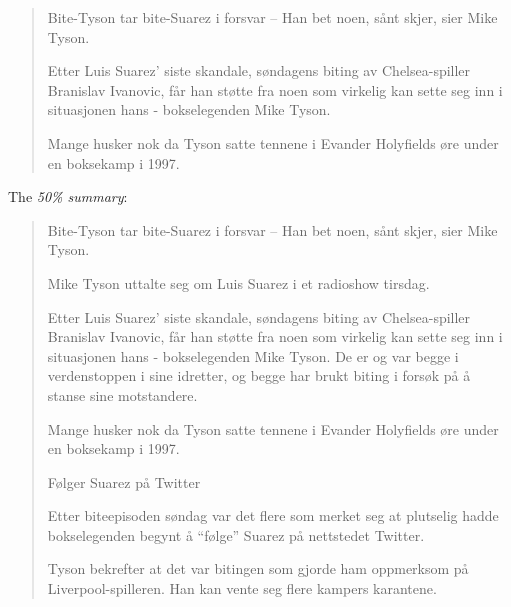 \documentclass[11pt,a4paper]{article}
\begin{document}
    \begin{quotation}
      Bite-Tyson tar bite-Suarez i forsvar
      – Han bet noen, sånt skjer, sier Mike Tyson.

      Etter Luis Suarez' siste skandale, søndagens biting av Chelsea-spiller Branislav Ivanovic, får han støtte fra noen som virkelig kan sette seg inn i situasjonen hans - bokselegenden Mike Tyson.

      Mange husker nok da Tyson satte tennene i Evander Holyfields øre under en boksekamp i 1997.
    \end{quotation}

    The \emph{50\% summary}:

    \begin{quotation}
      Bite-Tyson tar bite-Suarez i forsvar
      – Han bet noen, sånt skjer, sier Mike Tyson.

      Mike Tyson uttalte seg om Luis Suarez i et radioshow tirsdag.

      Etter Luis Suarez' siste skandale, søndagens biting av Chelsea-spiller Branislav Ivanovic, får han støtte fra noen som virkelig kan sette seg inn i situasjonen hans - bokselegenden Mike Tyson. De er og var begge i verdenstoppen i sine idretter, og begge har brukt biting i forsøk på å stanse sine motstandere.

      Mange husker nok da Tyson satte tennene i Evander Holyfields øre under en boksekamp i 1997.

      Følger Suarez på Twitter

      Etter biteepisoden søndag var det flere som merket seg at plutselig hadde bokselegenden begynt å ``følge'' Suarez på nettstedet Twitter.

      Tyson bekrefter at det var bitingen som gjorde ham oppmerksom på Liverpool-spilleren. Han kan vente seg flere kampers karantene.
    \end{quotation}


\end{document}
